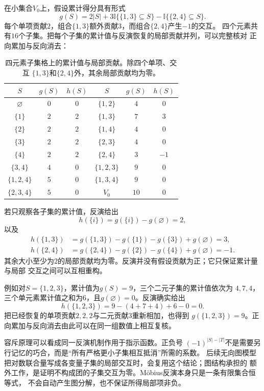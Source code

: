 在小集合$V_0$上，假设累计得分具有形式
\[
  g(S)
  =
  2|S|
  +3\mathbb{I}\{\{1,3\}\subseteq S\}
  -\mathbb{I}\{\{2,4\}\subseteq S\}.
\]
每个单项贡献$2$，组合$\{1,3\}$额外贡献$3$，而组合$\{2,4\}$产生$-1$的交互。
四个元素共有$16$个子集。把每个子集的累计值与反演恢复的局部贡献并列，可以完整核对
正向累加与反向消去：
\begin{table}[htbp]
  \centering
  \caption{四元素子集格上的累计值与局部贡献。除四个单项、交互
  $\{1,3\}$和$\{2,4\}$外，其余局部贡献均为零。}
  \label{tab:comb-four-element-mobius}
  \begin{tabular}{ccc@{\qquad}ccc}
    \toprule
    $S$ & $g(S)$ & $h(S)$ & $S$ & $g(S)$ & $h(S)$ \\
    \midrule
    $\varnothing$ & $0$ & $0$ & $\{1,2\}$ & $4$ & $0$ \\
    $\{1\}$ & $2$ & $2$ & $\{1,3\}$ & $7$ & $3$ \\
    $\{2\}$ & $2$ & $2$ & $\{1,4\}$ & $4$ & $0$ \\
    $\{3\}$ & $2$ & $2$ & $\{2,3\}$ & $4$ & $0$ \\
    $\{4\}$ & $2$ & $2$ & $\{2,4\}$ & $3$ & $-1$ \\
    $\{3,4\}$ & $4$ & $0$ & $\{1,2,3\}$ & $9$ & $0$ \\
    $\{1,2,4\}$ & $5$ & $0$ & $\{1,3,4\}$ & $9$ & $0$ \\
    $\{2,3,4\}$ & $5$ & $0$ & $V_0$ & $10$ & $0$ \\
    \bottomrule
  \end{tabular}
\end{table}
若只观察各子集的累计值，反演给出
\[
  h(\{i\})=g(\{i\})-g(\varnothing)=2,
\]
以及
\[
  \begin{aligned}
  h(\{1,3\})
  &=g(\{1,3\})-g(\{1\})-g(\{3\})+g(\varnothing)=3,\\
  h(\{2,4\})
  &=g(\{2,4\})-g(\{2\})-g(\{4\})+g(\varnothing)=-1.
  \end{aligned}
\]
其余大小至少为$2$的局部贡献均为零。反演并没有假设贡献为正；它只保证累计量与局部
交互之间可以互相重构。

例如对$S=\{1,2,3\}$，累计值为$g(S)=9$，三个二元子集的累计值依次为
$4,7,4$，三个单元素累计值之和为$6$，且$g(\varnothing)=0$。反演确实给出
\[
  h(\{1,2,3\})=9-(4+7+4)+6-0=0.
\]
把已经恢复的单项贡献$2,2,2$与二元贡献$3$重新相加，也得到
$g(\{1,2,3\})=9$。正向累加与反向消去由此可以在同一组数值上相互复核。

容斥原理可以看成同一反演机制作用于指示函数。正负号
$(-1)^{|S|-|T|}$不是需要另行记忆的巧合，而是“所有严格更小子集相互抵消”所需的系数。
后续无向图模型把对数联合量写成各变量子集的局部交互时，会复用这个结论；图结构承担的
额外工作，是证明不构成团的子集交互为零。Möbius反演本身只是一条有限集合恒等式，
不会自动产生图分解，也不保证所得局部项非负。

